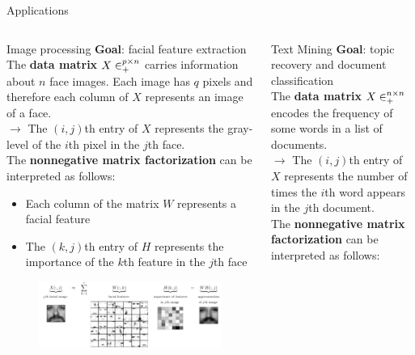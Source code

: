 \documentclass[final]{beamer}
\newlength{\onecolwid}
\newlength{\threecolwid}
\begin{document}
\begin{frame}
\begin{columns}[t]
\begin{column}{\threecolwid}
\begin{exampleblock}{Applications}
\begin{columns}[t]
\begin{column}{\onecolwid}
\begin{block}{Image processing}
\textbf{Goal}: facial feature extraction\\
The \textbf{data matrix} $X\in\real^{p\times n}_+$ carries information about $n$ face images. Each image has $q$ pixels and therefore each column of $X$ represents an image of a face.\\
$\rightarrow$ The $(i,j)$th entry of $X$ represents the gray-level of the $i$th pixel in the $j$th face.\\
The \textbf{nonnegative matrix factorization} can be interpreted as follows:\\
\begin{itemize}
    \item Each column of the matrix $W$ represents a facial feature
    \item The $(k,j)$th entry of $H$ represents the importance of the $k$th feature in the $j$th face
\end{itemize}
\begin{figure}
    \centering
    \includegraphics{../images/NMF_app1.png}
\end{figure}
\end{block}
\end{column}
\begin{column}{\onecolwid}
\begin{block}{Text Mining}
\textbf{Goal}: topic recovery and document classification\\
The \textbf{data matrix} $X\in\real^{n\times n}_+$ encodes the frequency of some words in a list of documents.\\
$\rightarrow$ The $(i,j)$th entry of $X$ represents the number of times the $i$th word appears in the $j$th document.\\
The \textbf{nonnegative matrix factorization} can be interpreted as follows:\\

\end{block}
\end{column}
\end{columns}
\end{exampleblock}
\end{column}
\end{columns}
\end{frame}
\end{document}
